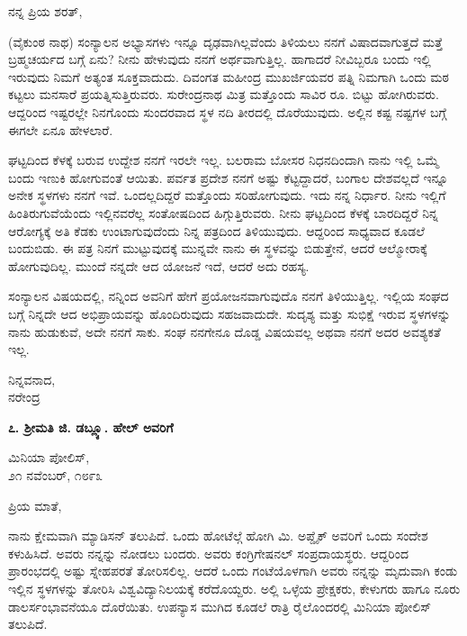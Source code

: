 ನನ್ನ ಪ್ರಿಯ ಶರತ್,

(ವೈಕುಂಠ ನಾಥ) ಸಂನ್ಯಾಲನ ಅಭ್ಯಾಸಗಳು ಇನ್ನೂ ದೃಢವಾಗಿಲ್ಲವೆಂದು ತಿಳಿಯಲು ನನಗೆ ವಿಷಾದವಾಗುತ್ತದೆ ಮತ್ತೆ ಬ್ರಹ್ಮಚರ್ಯದ ಬಗ್ಗೆ ಏನು? ನೀನು ಹೇಳುವುದು ನನಗೆ ಅರ್ಥವಾಗುತ್ತಿಲ್ಲ. ಹಾಗಾದರೆ ನೀವಿಬ್ಬರೂ ಬಂದು ಇಲ್ಲಿ ಇರುವುದು ನಿಮಗೆ ಅತ್ಯಂತ ಸೂಕ್ತವಾದುದು. ದಿವಂಗತ ಮಹೀಂದ್ರ ಮುಖರ್ಜಿಯವರ ಪತ್ನಿ ನಿಮಗಾಗಿ ಒಂದು ಮಠ ಕಟ್ಟಲು ಮನಸಾರೆ ಪ್ರಯತ್ನಿಸುತ್ತಿರುವರು. ಸುರೇಂದ್ರನಾಥ ಮಿತ್ರ ಮತ್ತೊಂದು ಸಾವಿರ ರೂ. ಬಿಟ್ಟು ಹೋಗಿರುವರು. ಆದ್ದರಿಂದ ಇಷ್ಟರಲ್ಲೇ ನಿನಗೊಂದು ಸುಂದರವಾದ ಸ್ಥಳ ನದಿ ತೀರದಲ್ಲಿ ದೊರೆಯುವುದು. ಅಲ್ಲಿನ ಕಷ್ಟ ನಷ್ಟಗಳ ಬಗ್ಗೆ ಈಗಲೇ ಏನೂ ಹೇಳಲಾರೆ.

ಘಟ್ಟದಿಂದ ಕೆಳಕ್ಕೆ ಬರುವ ಉದ್ದೇಶ ನನಗೆ ಇರಲೇ ಇಲ್ಲ. ಬಲರಾಮ ಬೋಸರ ನಿಧನದಿಂದಾಗಿ ನಾನು ಇಲ್ಲಿ ಒಮ್ಮೆ ಬಂದು ಇಣುಕಿ ಹೋಗುವಂತೆ ಆಯಿತು. ಪರ್ವತ ಪ್ರದೇಶ ನನಗೆ ಅಷ್ಟು ಕೆಟ್ಟದ್ದಾದರೆ, ಬಂಗಾಲ ದೇಶವಲ್ಲದೆ ಇನ್ನೂ ಅನೇಕ ಸ್ಥಳಗಳು ನನಗೆ ಇವೆ. ಒಂದಲ್ಲದಿದ್ದರೆ ಮತ್ತೊಂದು ಸರಿಹೋಗುವುದು. ಇದು ನನ್ನ ನಿರ್ಧಾರ. ನೀನು ಇಲ್ಲಿಗೆ ಹಿಂತಿರುಗುವೆಯೆಂದು ಇಲ್ಲಿನವರೆಲ್ಲ ಸಂತೋಷದಿಂದ ಹಿಗ್ಗುತ್ತಿರುವರು. ನೀನು ಘಟ್ಟದಿಂದ ಕೆಳಕ್ಕೆ ಬಾರದಿದ್ದರೆ ನಿನ್ನ ಆರೋಗ್ಯಕ್ಕೆ ಅತಿ ಕೆಡಕು ಉಂಟಾಗುವುದೆಂದು ನಿನ್ನ ಪತ್ರದಿಂದ ತಿಳಿಯುವುದು. ಆದ್ದರಿಂದ ಸಾಧ್ಯವಾದ ಕೂಡಲೆ ಬಂದುಬಿಡು. ಈ ಪತ್ರ ನಿನಗೆ ಮುಟ್ಟುವುದಕ್ಕೆ ಮುನ್ನವೇ ನಾನು ಈ ಸ್ಥಳವನ್ನು ಬಿಡುತ್ತೇನೆ, ಆದರೆ ಆಲ್ಮೋರಾಕ್ಕೆ ಹೋಗುವುದಿಲ್ಲ. ಮುಂದೆ ನನ್ನದೇ ಆದ ಯೋಜನೆ ಇದೆ, ಆದರೆ ಅದು ರಹಸ್ಯ.

ಸಂನ್ಯಾಲನ ವಿಷಯದಲ್ಲಿ, ನನ್ನಿಂದ ಅವನಿಗೆ ಹೇಗೆ ಪ್ರಯೋಜನವಾಗುವುದೊ ನನಗೆ ತಿಳಿಯುತ್ತಿಲ್ಲ. ಇಲ್ಲಿಯ ಸಂಘದ ಬಗ್ಗೆ ನಿನ್ನದೇ ಆದ ಅಭಿಪ್ರಾಯವನ್ನು ಹೊಂದಿರುವುದು ಸಹಜವಾದುದೇ. ಸುದೃಶ್ಯ ಮತ್ತು ಸುಭಿಕ್ಷೆ ಇರುವ ಸ್ಥಳಗಳನ್ನು ನಾನು ಹುಡುಕುವೆ, ಅದೇ ನನಗೆ ಸಾಕು. ಸಂಘ ನನಗೇನೂ ದೊಡ್ಡ ವಿಷಯವಲ್ಲ ಅಥವಾ ನನಗೆ ಅದರ ಅವಶ್ಯಕತೆ ಇಲ್ಲ.

\begin{flushright}
ನಿನ್ನವನಾದ,\\ನರೇಂದ್ರ
\end{flushright}

\begin{center}
\textbf{೭. ಶ‍್ರೀಮತಿ ಜಿ. ಡಬ್ಲ್ಯೂ. ಹೇಲ್ ಅವರಿಗೆ}
\end{center}

\begin{flushright}
ಮಿನಿಯಾ ಪೋಲಿಸ್,\\೨೧ ನವೆಂಬರ್, ೧೮೯೩
\end{flushright}

ಪ್ರಿಯ ಮಾತೆ,

ನಾನು ಕ್ಷೇಮವಾಗಿ ಮ್ಯಾಡಿಸನ್ ತಲುಪಿದೆ. ಒಂದು ಹೋಟೆಲ್ಗೆ ಹೋಗಿ ಮಿ. ಅಪ್ಡೈಕ್ ಅವರಿಗೆ ಒಂದು ಸಂದೇಶ ಕಳುಹಿಸಿದೆ. ಅವರು ನನ್ನನ್ನು ನೋಡಲು ಬಂದರು. ಅವರು ಕಂಗ್ರಿಗೇಷನಲ್ ಸಂಪ್ರದಾಯಸ್ಥರು. ಆದ್ದರಿಂದ ಪ್ರಾರಂಭದಲ್ಲಿ ಅಷ್ಟು ಸ್ನೇಹಪರತೆ ತೋರಿಸಲಿಲ್ಲ. ಆದರೆ ಒಂದು ಗಂಟೆಯೊಳಗಾಗಿ ಅವರು ನನ್ನನ್ನು ಮೃದುವಾಗಿ ಕಂಡು ಇಲ್ಲಿನ ಸ್ಥಳಗಳನ್ನು ತೋರಿಸಿ ವಿಶ್ವವಿದ್ಯಾನಿಲಯಕ್ಕೆ ಕರೆದೊಯ್ದರು. ಅಲ್ಲಿ ಒಳ್ಳೆಯ ಪ್ರೇಕ್ಷಕರು, ಕೇಳುಗರು ಹಾಗೂ ನೂರು ಡಾಲರ್ಸಂಭಾವನೆಯೂ ದೊರೆಯಿತು. ಉಪನ್ಯಾಸ ಮುಗಿದ ಕೂಡಲೆ ರಾತ್ರಿ ರೈಲೊಂದರಲ್ಲಿ ಮಿನಿಯಾ ಪೋಲಿಸ್ ತಲುಪಿದೆ.

